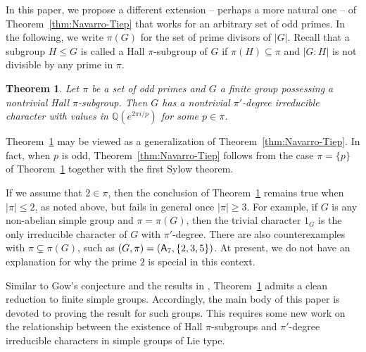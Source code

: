 \documentclass[12pt]{amsart}
\newtheorem{theorema}{Theorem}
\theoremstyle{definition}
\numberwithin{equation}{section}
\newcommand{\QQ}{{\mathbb Q}}
\newcommand{\Al}{\textup{\textsf{A}}}
\begin{document}
In this paper, we propose a different %
extension -- perhaps %
a more
natural %
one -- of %
Theorem~\ref{thm:Navarro-Tiep} that works for
an arbitrary set of odd primes. In the following, we write $\pi(G)$
for the set of prime divisors of $|G|$. Recall that a subgroup $H\le
G$ is called %
a Hall $\pi$-subgroup of %
$G$ if $\pi(H)\subseteq \pi$
and $|G:H|$ is not divisible by any prime in $\pi$.

\begin{theorema}\label{thm:main}
Let $\pi$ be a set of odd primes and $G$ a finite group possessing a
nontrivial Hall $\pi$-subgroup. Then $G$ has a nontrivial
$\pi'$-degree irreducible character with values in $\QQ(e^{2\pi
i/p})$ for some $p\in\pi$.
\end{theorema}



Theorem~\ref{thm:main} may be viewed as a generalization of
Theorem~\ref{thm:Navarro-Tiep}. In fact, when $p$ is odd,
Theorem~\ref{thm:Navarro-Tiep} follows from the case $\pi=\{p\}$ of
Theorem~\ref{thm:main} together with the first Sylow theorem.

If we assume that $2\in \pi$, then the conclusion of
Theorem~\ref{thm:main} remains true when $|\pi|\leq 2$, as noted
above, but fails in general once $|\pi|\geq 3$. For example, if $G$
is any non-abelian simple group and $\pi=\pi(G)$, then the trivial
character $1_G$ is the only irreducible character of $G$ with
$\pi'$-degree. There are also counterexamples with $\pi\varsubsetneq
\pi(G)$, such as $(G,\pi)=(\Al_7,\{2,3,5\})$. At present, we do not
have an explanation %
for why the prime $2$ is special in
this context.

Similar to Gow's conjecture and the results in
\cite{Navarro-Tiep1,GHSV21}, Theorem~\ref{thm:main} admits a clean
reduction to finite simple groups. Accordingly, the main body of
this paper is devoted to proving the result for such groups. This
requires some new work on the relationship between the existence %
of
Hall $\pi$-subgroups and %
$\pi'$-degree irreducible characters in
simple groups of Lie %
type.
\end{document}

